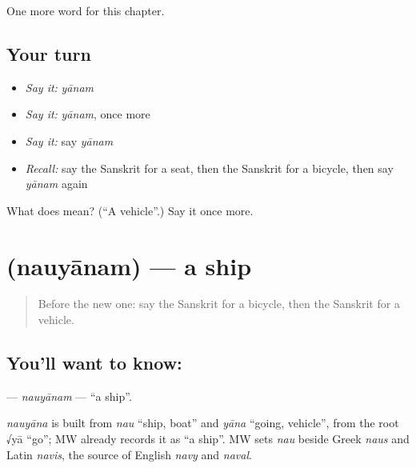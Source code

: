 \begin{grammarlens}[title={What you've built}]
One more word for this chapter.
\end{grammarlens}

\subsection*{Your turn}
\begin{itemize}
\raggedright
  \item \emph{Say it:} \emph{yānam}
  \item \emph{Say it:} \emph{yānam}, once more
  \item \emph{Say it:} say \emph{yānam}
  \item \emph{Recall:} say the Sanskrit for a seat, then the Sanskrit for a bicycle, then say \emph{yānam} again
\end{itemize}

\begin{tcolorbox}[breakable,colback=teal!4,colframe=teal!35!black,title={Before you move on}]
What does  mean? (\textquotedblleft{}A vehicle\textquotedblright{}.) Say it once more.
\end{tcolorbox}
\section[\texorpdfstring{\sk{नौयानम्} (nauyānam)}{नौयानम् (nauyānam)}]{ (nauyānam) — a ship}

\label{lesson:SA-C123-nauyanam}



\begin{quote}
Before the new one: say the Sanskrit for a bicycle, then the Sanskrit for a vehicle.
\end{quote}

\subsection*{You'll want to know: }
\textbf{} — \emph{nauyānam} — \textquotedblleft{}a ship\textquotedblright{}.

\begin{cousinweb}
\emph{nauyāna} is built from \emph{nau} \textquotedblleft{}ship, boat\textquotedblright{} and \emph{yāna} \textquotedblleft{}going, vehicle\textquotedblright{}, from the root √yā \textquotedblleft{}go\textquotedblright{}; MW already records it as \textquotedblleft{}a ship\textquotedblright{}. MW sets \emph{nau} beside Greek \emph{naus} and Latin \emph{navis}, the source of English \emph{navy} and \emph{naval}.
\end{cousinweb}

